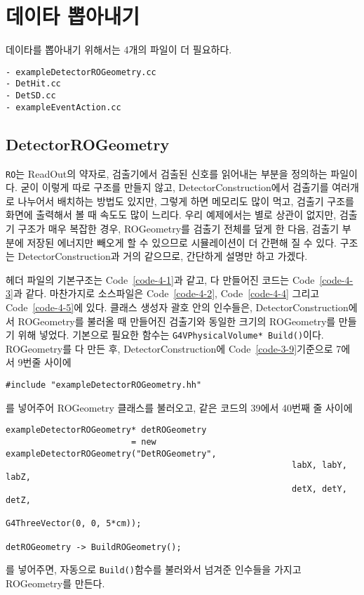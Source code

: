 \chapter{데이타 뽑아내기}

\setcounter{code}{0}

데이타를 뽑아내기 위해서는 4개의 파일이 더 필요하다.
\begin{verbatim}
- exampleDetectorROGeometry.cc
- DetHit.cc
- DetSD.cc
- exampleEventAction.cc
\end{verbatim}

\section{DetectorROGeometry}
\texttt{RO}는 ReadOut의 약자로, 검출기에서 검출된 신호를 읽어내는 부분을 정의하는
파일이다. 굳이 이렇게 따로 구조를 만들지 않고, DetectorConstruction에서
검출기를 여러개로 나누어서 배치하는 방법도 있지만, 그렇게 하면 메모리도 많이
먹고, 검출기 구조를 화면에 출력해서 볼 때 속도도 많이 느리다. 우리 예제에서는
별로 상관이 없지만, 검출기 구조가 매우 복잡한 경우, ROGeometry를 검출기 전체를
덮게 한 다음, 검출기 부분에 저장된 에너지만 빼오게 할 수 있으므로 시뮬레이션이
더 간편해 질 수 있다. 구조는 DetectorConstruction과 거의 같으므로, 간단하게
설명만 하고 가겠다.

헤더 파일의 기본구조는 Code~\ref{code-4-1}과 같고, 다 만들어진 코드는
Code~\ref{code-4-3}과 같다. 마찬가지로 소스파일은 Code~\ref{code-4-2},
Code~\ref{code-4-4} 그리고 Code~\ref{code-4-5}에 있다. 클래스 생성자 괄호 안의 인수들은,
DetectorConstruction에서 ROGeometry를 불러올 때 만들어진 검출기와 동일한 크기의
ROGeometry를 만들기 위해 넣었다. 기본으로 필요한 함수는
\texttt{G4VPhysicalVolume* Build()}이다. ROGeometry를 다 만든 후,
DetectorConstruction에 Code~\ref{code-3-9}기준으로 7에서 9번줄 사이에
\begin{pc}
\begin{lstlisting}
#include "exampleDetectorROGeometry.hh"
\end{lstlisting}
\end{pc}
를 넣어주어 ROGeometry 클래스를 불러오고, 같은 코드의 39에서 40번째 줄 사이에
\begin{pc}
\begin{lstlisting}
exampleDetectorROGeometry* detROGeometry
                         = new exampleDetectorROGeometry("DetROGeometry",
                                                         labX, labY, labZ,
                                                         detX, detY, detZ,
                                                         G4ThreeVector(0, 0, 5*cm));

detROGeometry -> BuildROGeometry();
\end{lstlisting}
\end{pc}
를 넣어주면, 자동으로 \texttt{Build()}함수를 불러와서 넘겨준 인수들을 가지고
ROGeometry를 만든다.

